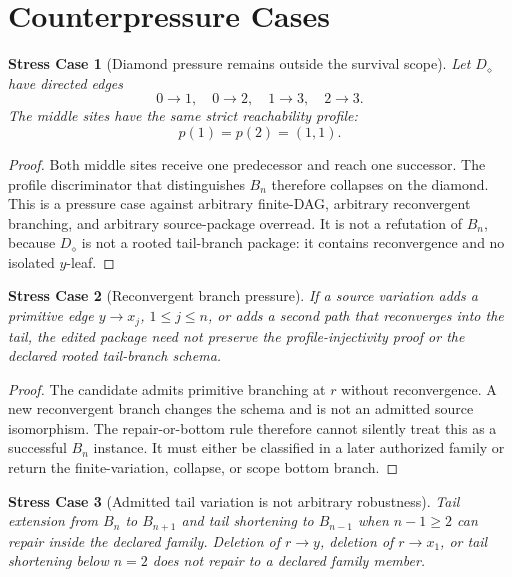 \documentclass[11pt]{article}
\newcommand{\Bn}{B_n}
\newcommand{\Diamond}{D_{\diamond}}
\newtheorem{stresscase}{Stress Case}
\begin{document}
\section{Counterpressure Cases}

\begin{stresscase}[Diamond pressure remains outside the survival scope]
Let \(\Diamond\) have directed edges
\[
0\to 1,\quad 0\to 2,\quad 1\to 3,\quad 2\to 3.
\]
The middle sites have the same strict reachability profile:
\[
p(1)=p(2)=(1,1).
\]
\end{stresscase}

\begin{proof}
Both middle sites receive one predecessor and reach one successor. The
profile discriminator that distinguishes \(\Bn\) therefore collapses on the
diamond. This is a pressure case against arbitrary finite-DAG, arbitrary
reconvergent branching, and arbitrary source-package overread. It is not a
refutation of \(\Bn\), because \(\Diamond\) is not a rooted tail-branch
package: it contains reconvergence and no isolated \(y\)-leaf.
\end{proof}

\begin{stresscase}[Reconvergent branch pressure]
If a source variation adds a primitive edge \(y\to x_j\), \(1\le j\le n\), or
adds a second path that reconverges into the tail, the edited package need
not preserve the profile-injectivity proof or the declared rooted
tail-branch schema.
\end{stresscase}

\begin{proof}
The candidate admits primitive branching at \(r\) without reconvergence. A
new reconvergent branch changes the schema and is not an admitted source
isomorphism. The repair-or-bottom rule therefore cannot silently treat this
as a successful \(\Bn\) instance. It must either be classified in a later
authorized family or return the finite-variation, collapse, or scope bottom
branch.
\end{proof}

\begin{stresscase}[Admitted tail variation is not arbitrary robustness]
Tail extension from \(\Bn\) to \(B_{n+1}\) and tail shortening to
\(B_{n-1}\) when \(n-1\ge 2\) can repair inside the declared family.
Deletion of \(r\to y\), deletion of \(r\to x_1\), or tail shortening below
\(n=2\) does not repair to a declared family member.
\end{stresscase}
\end{document}
